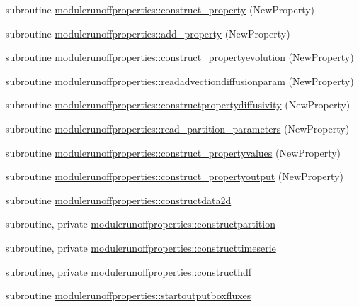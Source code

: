 \begin{DoxyCompactItemize}
\item 
subroutine \mbox{\hyperlink{namespacemodulerunoffproperties_aca58b5228ca3591f05eb014b1b370a57}{modulerunoffproperties\+::construct\+\_\+property}} (New\+Property)
\item 
subroutine \mbox{\hyperlink{namespacemodulerunoffproperties_af131ec1efa38bd73fc48b57ad5a02e86}{modulerunoffproperties\+::add\+\_\+property}} (New\+Property)
\item 
subroutine \mbox{\hyperlink{namespacemodulerunoffproperties_aa934a2b16151c8ba36343b555f143da8}{modulerunoffproperties\+::construct\+\_\+propertyevolution}} (New\+Property)
\item 
subroutine \mbox{\hyperlink{namespacemodulerunoffproperties_ade7661d1679610044a3f568f06610532}{modulerunoffproperties\+::readadvectiondiffusionparam}} (New\+Property)
\item 
subroutine \mbox{\hyperlink{namespacemodulerunoffproperties_abe332d8f07a02030f5b0712c32f01262}{modulerunoffproperties\+::constructpropertydiffusivity}} (New\+Property)
\item 
subroutine \mbox{\hyperlink{namespacemodulerunoffproperties_ab3fc52402148877652dc3cb453fd27be}{modulerunoffproperties\+::read\+\_\+partition\+\_\+parameters}} (New\+Property)
\item 
subroutine \mbox{\hyperlink{namespacemodulerunoffproperties_a72bab581ca5f460f8d99af192c79b0ed}{modulerunoffproperties\+::construct\+\_\+propertyvalues}} (New\+Property)
\item 
subroutine \mbox{\hyperlink{namespacemodulerunoffproperties_aaad69eea7f005151f91a94b3105aed34}{modulerunoffproperties\+::construct\+\_\+propertyoutput}} (New\+Property)
\item 
subroutine \mbox{\hyperlink{namespacemodulerunoffproperties_a3a9583323dea60d8001dd48bf958642e}{modulerunoffproperties\+::constructdata2d}}
\item 
subroutine, private \mbox{\hyperlink{namespacemodulerunoffproperties_ac7e05edd5458dddb9680976873653eec}{modulerunoffproperties\+::constructpartition}}
\item 
subroutine, private \mbox{\hyperlink{namespacemodulerunoffproperties_a00eb7dbee6a76f3b846621e0aad282c0}{modulerunoffproperties\+::constructtimeserie}}
\item 
subroutine, private \mbox{\hyperlink{namespacemodulerunoffproperties_ab553b53f61f80a77a664735dc1b72d44}{modulerunoffproperties\+::constructhdf}}
\item 
subroutine \mbox{\hyperlink{namespacemodulerunoffproperties_a06106b336b804481c4fd8b518bb683fe}{modulerunoffproperties\+::startoutputboxfluxes}}

\end{DoxyCompactItemize}
